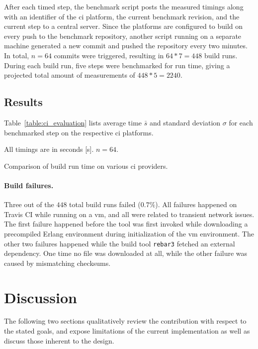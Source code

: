 After each timed step, the benchmark script posts the measured timings along with an identifier of the \acrshort{ci} platform, the current benchmark revision, and the current step to a central server. Since the platforms are configured to build on every push to the benchmark repository, another script running on a separate machine generated a new commit and pushed the repository every two minutes. In total, $n=64$ commits were triggered, resulting in $64*7=448$ build runs. During each build run, five steps were benchmarked for run time, giving a projected total amount of measurements of $448*5=2240$.

\cleardoublepage
\subsection{Results}
Table~\ref{table:ci_evaluation} lists average time $\bar{s}$ and standard deviation $\sigma$ for each benchmarked step on the respective \acrshort{ci} platforms.

\begin{table}[h]
  \setlength{\tabcolsep}{8.6pt}
  \renewcommand{\arraystretch}{1.5}
  \centering
  
  \vspace{6pt}
  All timings are in seconds [s]. $n=64$.

  \caption{Comparison of build run time on various \acrshort{ci} providers.}\label{table:ci_evaluation}
\end{table}

\paragraph{Build failures.} Three out of the $448$ total build runs failed ($0.7\%$). All failures happened on Travis CI while running on a \acrshort{vm}, and all were related to transient network issues. The first failure happened before the tool was first invoked while downloading a precompiled Erlang environment during initialization of the \acrshort{vm} environment.
The other two failures happened while the build tool \lstinline|rebar3| fetched an external dependency. One time no file was downloaded at all, while the other failure was caused by mismatching checksums.

\cleardoublepage
\section{Discussion}

The following two sections qualitatively review the contribution with respect to the stated goals, and expose limitations of the current implementation as well as discuss those inherent to the design.

